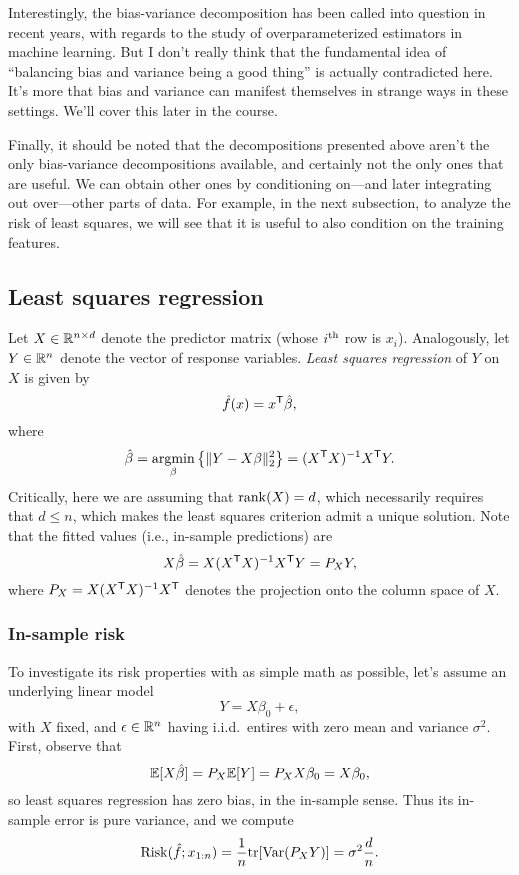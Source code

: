 \documentclass{article}
\begin{document}
Interestingly, the bias-variance decomposition has been called into question in
recent years, with regards to the study of overparameterized estimators in
machine learning. But I don't really think that the fundamental idea of
``balancing bias and variance being a good thing'' is actually contradicted 
here. It's more that bias and variance can manifest themselves in strange ways
in these settings. We'll cover this later in the course. 

Finally, it should be noted that the decompositions presented above aren't the
only bias-variance decompositions available, and certainly not the only ones
that are useful. We can obtain other ones by conditioning on---and later
integrating out over---other parts of data. For example, in the next subsection,
to analyze the risk of least squares, we will see that it is useful to also
condition on the training features.

\subsection{Least squares regression}

Let $X \in \mathbb{R}^{n \times d}$ denote the predictor matrix (whose $i^{\text{th}}$ row is
$x_i$). Analogously, let $Y \in \mathbb{R}^n$ denote the vector of response
variables. \emph{Least squares regression} of $Y$ on $X$ is given by 
\[
\hat{f}(x) = x^{\mathsf{T}} \hat{\beta},
\]
where 
\[
\hat{\beta} = \mathop{\mathrm{argmin}}_\beta \big\{ \|Y - X\beta\|_2^2 \big\} = (X^{\mathsf{T}} X)^{-1} X^{\mathsf{T}} Y.  
\]
Critically, here we are assuming that $\mathrm{rank}(X) = d$, which necessarily requires
that $d \leq n$, which makes the least squares criterion admit a unique
solution. Note that the fitted values (i.e., in-sample predictions) are 
\[
X\hat{\beta} = X (X^{\mathsf{T}} X)^{-1} X^{\mathsf{T}} Y = P_X Y,
\]
where $P_X = X (X^{\mathsf{T}} X)^{-1} X^{\mathsf{T}} $ denotes the projection onto the column space
of $X$. 

\subsubsection{In-sample risk}

To investigate its risk properties with as simple math as possible, let's assume
an underlying linear model  
\begin{equation}
\label{eq:linear_model}
Y = X\beta_0 + \epsilon,
\end{equation}
with $X$ fixed, and $\epsilon \in \mathbb{R}^n$ having i.i.d.\ entires with zero mean
and variance $\sigma^2$. First, observe that  
\[
\mathbb{E}[X \hat{\beta}] = P_X \mathbb{E}[Y] = P_X X \beta_0 = X \beta_0,
\]
so least squares regression has zero bias, in the in-sample sense. Thus its
in-sample error is pure variance, and we compute 
\begin{equation}
\label{eq:least_squares_in}
\mathrm{Risk}(\hat{f}; x_{1:n}) = \frac{1}{n} \mathrm{tr}[\mathrm{Var}(P_X Y)] = \sigma^2 \frac{d}{n}.
\end{equation}
\end{document}

